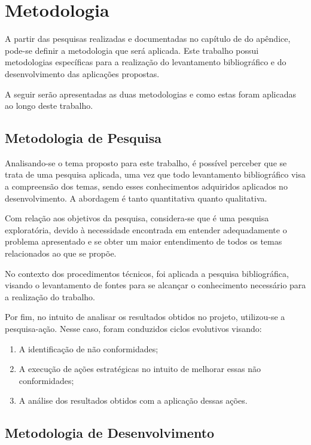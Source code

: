 \chapter{Metodologia}
\label{chapter:Metodologia}

A partir das pesquisas realizadas e documentadas no capítulo de  do apêndice, pode-se definir a metodologia que será aplicada. Este trabalho possui metodologias específicas para a realização do levantamento bibliográfico e do desenvolvimento das aplicações propostas.

A seguir serão apresentadas as duas metodologias e como estas foram aplicadas ao longo deste trabalho.

\section{Metodologia de Pesquisa}

Analisando-se o tema proposto para este trabalho, é possível perceber que se trata de uma pesquisa aplicada, uma vez que todo levantamento bibliográfico visa a compreensão dos temas, sendo esses conhecimentos adquiridos aplicados no desenvolvimento. A abordagem é tanto quantitativa quanto qualitativa.

Com relação aos objetivos da pesquisa, considera-se que é uma pesquisa exploratória, devido à necessidade encontrada em entender adequadamente o problema apresentado e se obter um maior entendimento de todos os temas relacionados ao que se propõe.

No contexto dos procedimentos técnicos, foi aplicada a pesquisa bibliográfica, visando o levantamento de fontes para se alcançar o conhecimento necessário para a realização do trabalho.

Por fim, no intuito de analisar os resultados obtidos no projeto, utilizou-se a pesquisa-ação. Nesse caso, foram conduzidos ciclos evolutivos visando:

\begin{enumerate}
	\item A identificação de não conformidades;
	\item A execução de ações estratégicas no intuito de melhorar essas não conformidades;
	\item A análise dos resultados obtidos com a aplicação dessas ações.
\end{enumerate}

\section{Metodologia de Desenvolvimento}

